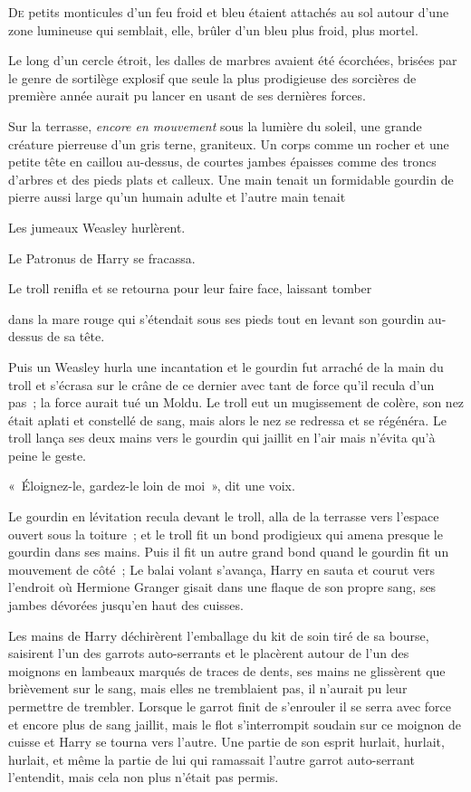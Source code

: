 
\lettrine{D}{e} petits monticules d'un feu froid et bleu étaient attachés au sol autour d'une zone lumineuse qui semblait, elle, brûler d'un bleu plus froid, plus mortel.

Le long d'un cercle étroit, les dalles de marbres avaient été écorchées, brisées par le genre de sortilège explosif que seule la plus prodigieuse des sorcières de première année aurait pu lancer en usant de ses dernières forces.

Sur la terrasse, \emph{encore en mouvement} sous la lumière du soleil, une grande créature pierreuse d'un gris terne, graniteux.
Un corps comme un rocher et une petite tête en caillou au-dessus, de courtes jambes épaisses comme des troncs d'arbres et des pieds plats et calleux.
Une main tenait un formidable gourdin de pierre aussi large qu'un humain adulte et l'autre main tenait

Les jumeaux Weasley hurlèrent.

Le Patronus de Harry se fracassa.

Le troll renifla et se retourna pour leur faire face, laissant tomber

dans la mare rouge qui s'étendait sous ses pieds tout en levant son gourdin au-dessus de sa tête.

Puis un Weasley hurla une incantation et le gourdin fut arraché de la main du troll et s'écrasa sur le crâne de ce dernier avec tant de force qu'il recula d'un pas~; la force aurait tué un Moldu.
Le troll eut un mugissement de colère, son nez était aplati et constellé de sang, mais alors le nez se redressa et se régénéra.
Le troll lança ses deux mains vers le gourdin qui jaillit en l'air mais n'évita qu'à peine le geste.

«~Éloignez-le, gardez-le loin de moi~», dit une voix.

Le gourdin en lévitation recula devant le troll, alla de la terrasse vers l'espace ouvert sous la toiture~; et le troll fit un bond prodigieux qui amena presque le gourdin dans ses mains.
Puis il fit un autre grand bond quand le gourdin fit un mouvement de côté~; Le balai volant s'avança, Harry en sauta et courut vers l'endroit où Hermione Granger gisait dans une flaque de son propre sang, ses jambes dévorées jusqu'en haut des cuisses.

Les mains de Harry déchirèrent l'emballage du kit de soin tiré de sa bourse, saisirent l'un des garrots auto-serrants et le placèrent autour de l'un des moignons en lambeaux marqués de traces de dents, ses mains ne glissèrent que brièvement sur le sang, mais elles ne tremblaient pas, il n'aurait pu leur permettre de trembler.
Lorsque le garrot finit de s'enrouler il se serra avec force et encore plus de sang jaillit, mais le flot s'interrompit soudain sur ce moignon de cuisse et Harry se tourna vers l'autre.
Une partie de son esprit hurlait, hurlait, hurlait, et même la partie de lui qui ramassait l'autre garrot auto-serrant l'entendit, mais cela non plus n'était pas permis.

